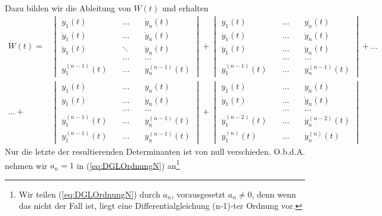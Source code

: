 Dazu bilden wir die Ableitung von $W(t)$ und erhalten
\begin{align}
  \dot{W}(t)=&\begin{vmatrix}
    \dot{y}_1(t)&\quad\dots\quad &\dot{y}_n(t)\\
           \dot{y}_1(t)&\quad\dots\quad &\dot{y}_n(t)\\
           \ddot{y}_1(t)&\quad\ddots\quad &\ddot{y}_n(t)\\
                       &\quad\dots\quad&\dots\\
           y^{(n-1)}_1(t)&\quad\dots\quad &y^{(n-1)}_n(t)
         \end{vmatrix}+
	 \begin{vmatrix}
           y_1(t)&\quad\dots\quad &y_n(t)\\
           \ddot{y}_1(t)&\quad\dots\quad &\ddot{y}_n(t)\\
           \ddot{y}_1(t)&\quad\dots\quad &\ddot{y}_n(t)\\
                       &\quad\dots\quad&\dots\\
           y^{(n-1)}_1(t)&\quad\dots\quad &y^{(n-1)}_n(t)
         \end{vmatrix}+\dots\\
      \dots+&\begin{vmatrix}
           y_1(t)&\quad\dots\quad &y_n(t)\\
           \dot{y}_1(t)&\quad\dots\quad &\dot{y}_n(t)\\
                       &\quad\dots\quad&\dots\\
           y^{(n-1)}_1(t)&\quad\dots\quad &y^{(n-1)}_n(t)\\
           y^{(n-1)}_1(t)&\quad\dots\quad &y^{(n-1)}_n(t)
         \end{vmatrix}+
      \begin{vmatrix}
           y_1(t)&\quad\dots\quad &y_n(t)\\
           \dot{y}_1(t)&\quad\dots\quad &\dot{y}_n(t)\\
                       &\quad\dots\quad&\dots\\
           y^{(n-2)}_1(t)&\quad\dots\quad &y^{(n-2)}_n(t)\\
           y^{(n)}_1(t)&\quad\dots\quad &y^{(n)}_n(t)
         \end{vmatrix}
  \label{eq:WronskianDerivative1}
\end{align}
Nur die letzte der resultierenden Determinanten ist von null verschieden.
O.b.d.A. nehmen wir $a_n=1$ in (\ref{eq:DGLOrdnungN}) an\footnote[1]{Wir teilen
(\ref{eq:DGLOrdnungN}) durch $a_n$, vorausgesetzt $a_n\ne0$, denn wenn das
nicht der Fall ist, liegt eine Differentialgleichung (n-1)-ter Ordnung vor.}

